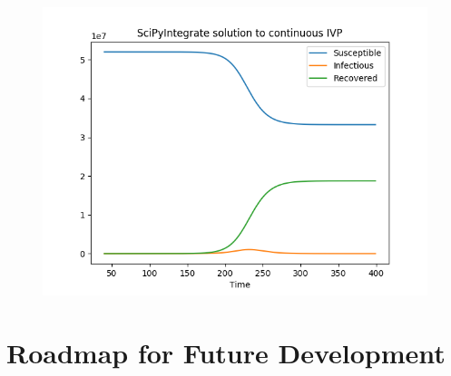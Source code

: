 \documentclass[11pt]{article}
\begin{document}
\begin{figure}
\includegraphics[width=\textwidth]{figs/QueryResult.png}
\caption{}
\label{Fig:QueryResult}
\end{figure}

\section{Roadmap for Future Development}


\end{document}
